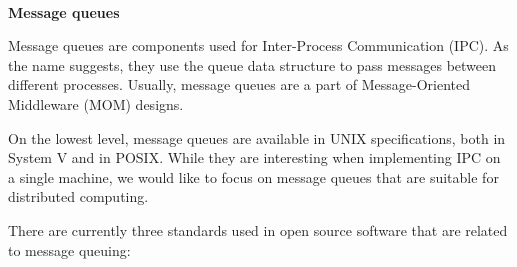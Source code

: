 \hspace*{\fill} \\ %
\noindent
\textbf{Message queues}

Message queues are components used for Inter-Process Communication (IPC). As the name suggests, they use the queue data structure to pass messages between different processes. Usually, message queues are a part of Message-Oriented Middleware (MOM) designs.

On the lowest level, message queues are available in UNIX specifications, both in System V and in POSIX. While they are interesting when implementing IPC on a single machine, we would like to focus on message queues that are suitable for distributed computing.

There are currently three standards used in open source software that are related to message queuing:

